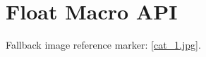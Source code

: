 \documentclass[a4paper,12pt]{report}
\begin{document}
\chapter{Float Macro API}
Fallback image reference marker: \ref{cat_1.jpg}.
\end{document}
